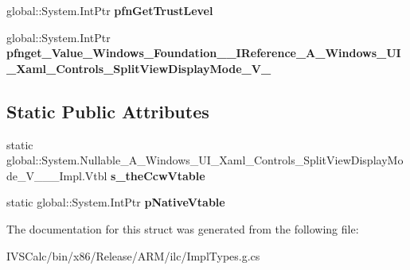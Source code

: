 \begin{DoxyCompactItemize}
global\+::\+System.\+Int\+Ptr {\bfseries pfn\+Get\+Trust\+Level}
\item 
\mbox{\label{struct_system_1_1_nullable___a___windows___u_i___xaml___controls___split_view_display_mode___v_______impl_1_1_vtbl_a107daf1a10aecbf8161466b1df44f003}} 
global\+::\+System.\+Int\+Ptr {\bfseries pfnget\+\_\+\+Value\+\_\+\+Windows\+\_\+\+Foundation\+\_\+\+\_\+\+I\+Reference\+\_\+\+A\+\_\+\+Windows\+\_\+\+U\+I\+\_\+\+Xaml\+\_\+\+Controls\+\_\+\+Split\+View\+Display\+Mode\+\_\+\+V\+\_\+}
\end{DoxyCompactItemize}
\subsection*{Static Public Attributes}
\begin{DoxyCompactItemize}
\item 
\mbox{\label{struct_system_1_1_nullable___a___windows___u_i___xaml___controls___split_view_display_mode___v_______impl_1_1_vtbl_a87bd6d4e53ee90afc70c70608fcf37f7}} 
static global\+::\+System.\+Nullable\+\_\+\+A\+\_\+\+Windows\+\_\+\+U\+I\+\_\+\+Xaml\+\_\+\+Controls\+\_\+\+Split\+View\+Display\+Mode\+\_\+\+V\+\_\+\+\_\+\+\_\+\+Impl.\+Vtbl {\bfseries s\+\_\+the\+Ccw\+Vtable}
\item 
\mbox{\label{struct_system_1_1_nullable___a___windows___u_i___xaml___controls___split_view_display_mode___v_______impl_1_1_vtbl_acefc643c0899fb7a387cdb60b9306c6f}} 
static global\+::\+System.\+Int\+Ptr {\bfseries p\+Native\+Vtable}
\end{DoxyCompactItemize}


The documentation for this struct was generated from the following file\+:\begin{DoxyCompactItemize}
\item 
I\+V\+S\+Calc/bin/x86/\+Release/\+A\+R\+M/ilc/Impl\+Types.\+g.\+cs\end{DoxyCompactItemize}
